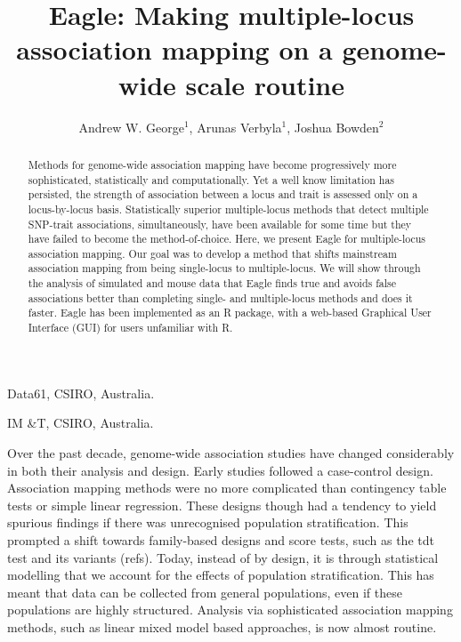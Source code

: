 \documentclass{nature}
\begin{document}
\title{Eagle: Making multiple-locus association mapping on a genome-wide scale routine}
\author{Andrew W. George$^1$, Arunas Verbyla$^1$, Joshua Bowden$^2$}

\maketitle




\begin{affiliations}
\item Data61, CSIRO, Australia.
\item IM \&T, CSIRO, Australia.
\end{affiliations}

\begin{abstract}

Methods for genome-wide association mapping have become progressively more sophisticated, statistically and computationally. Yet a well know limitation has persisted, the strength of association between a locus and trait is assessed only on a locus-by-locus basis. Statistically superior multiple-locus methods that detect multiple SNP-trait associations, simultaneously, have been available for some time but they have failed to become the method-of-choice. 
Here, we present Eagle for multiple-locus association mapping. Our goal was to develop a method that shifts mainstream association mapping from being single-locus to multiple-locus. We will show through the analysis of simulated and mouse data that Eagle finds true and avoids false 
associations better than completing single- and multiple-locus methods and does it faster. Eagle has been implemented as an R package, with a web-based Graphical User Interface (GUI) for users unfamiliar with R.
\end{abstract}


Over the past decade,  genome-wide association studies have changed considerably in both their analysis and design. Early studies
 followed a case-control design. Association mapping methods were no more complicated than contingency table tests or simple 
linear regression. These designs though had a tendency to yield spurious findings if there was unrecognised population stratification. This prompted a shift towards family-based designs and score tests, such as the tdt test and its variants (refs). Today, instead of by design, it is through statistical modelling that we account for the effects of population stratification. This has meant that data can be collected from general populations, even if these populations are highly structured. Analysis via sophisticated association mapping methods, such as linear mixed model based approaches,  is now almost routine.
\end{document}
